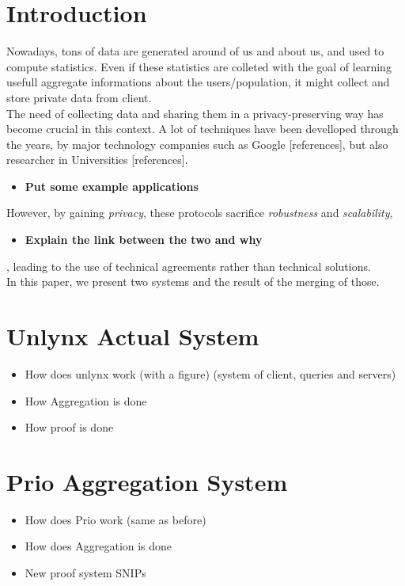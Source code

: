 \documentclass{article}
\begin{document}
\section*{Introduction}
Nowadays, tons of data are generated around of us and about us, and used to compute statistics.  Even if these statistics are colleted with the goal of learning usefull aggregate informations about the users/population, it might collect and store private data from client.\\
The need of collecting data and sharing them in a privacy-preserving way has become crucial in this context. A lot of techniques have been develloped through the years, by major technology companies such as Google [references], but also researcher in Universities [references].\\
\begin{itemize}
\item \textbf{Put some example applications}\\
\end{itemize}
However, by gaining \textit{privacy}, these protocols sacrifice \textit{robustness} and \textit{scalability},\\
\begin{itemize}
\item \textbf{Explain the link between the two and why}
\end{itemize}
, leading to the use of technical agreements rather than technical solutions.\\
In this paper, we present two systems and the result of the merging of those.

\section*{Unlynx Actual System}
\begin{itemize}
\item How does unlynx work (with a figure) (system of client, queries and servers)
\item How Aggregation is done
\item How proof is done

\end{itemize}

\section*{Prio Aggregation System}
\begin{itemize}
\item How does Prio work (same as before)
\item How does Aggregation is done
\item New proof system SNIPs
\end{itemize}
\end{document}
